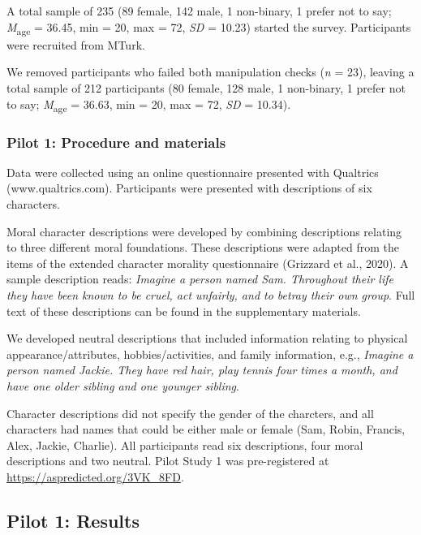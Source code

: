 \documentclass[
  english,
  man,floatsintext]{apa7}
\begin{document}
A total sample of 235 (89 female, 142 male, 1 non-binary, 1 prefer not to say; \emph{M}\textsubscript{age} = 36.45, min = 20, max = 72, \emph{SD} = 10.23) started the survey. Participants were recruited from MTurk.

We removed participants who failed both manipulation checks (\emph{n} = 23), leaving a total sample of 212 participants (80 female, 128 male, 1 non-binary, 1 prefer not to say; \emph{M}\textsubscript{age} = 36.63, min = 20, max = 72, \emph{SD} = 10.34).

\hypertarget{pilot-1-procedure-and-materials}{%
\subsubsection{Pilot 1: Procedure and materials}\label{pilot-1-procedure-and-materials}}

Data were collected using an online questionnaire presented with Qualtrics (www.qualtrics.com). Participants were presented with descriptions of six characters.

Moral character descriptions were developed by combining descriptions relating to three different moral foundations. These descriptions were adapted from the items of the extended character morality questionnaire (Grizzard et al., 2020). A sample description reads: \emph{Imagine a person named Sam. Throughout their life they have been known to be cruel, act unfairly, and to betray their own group}. Full text of these descriptions can be found in the supplementary materials.

We developed neutral descriptions that included information relating to physical appearance/attributes, hobbies/activities, and family information, e.g., \emph{Imagine a person named Jackie. They have red hair, play tennis four times a month, and have one older sibling and one younger sibling}.

Character descriptions did not specify the gender of the charcters, and all characters had names that could be either male or female (Sam, Robin, Francis, Alex, Jackie, Charlie). All participants read six descriptions, four moral descriptions and two neutral. Pilot Study 1 was pre-registered at \color{blue}\url{https://aspredicted.org/3VK_8FD}\color{black}.

\hypertarget{pilot-1-results}{%
\subsection{Pilot 1: Results}\label{pilot-1-results}}
\end{document}
